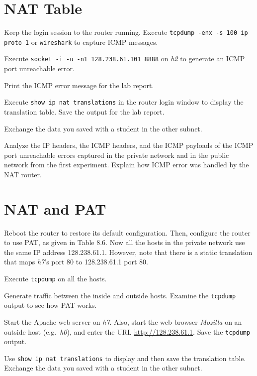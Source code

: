 \documentclass{../UTNetLab}
\begin{document}
\section{NAT Table}
    Keep the login session to the router running. Execute \lstinline{tcpdump -enx -s 100 ip proto 1} or \lstinline{wireshark} to capture ICMP messages. 

    Execute \lstinline{socket -i -u -n1 128.238.61.101 8888} on \textit{h2} to generate an ICMP port unreachable error. 

    Print the ICMP error message for the lab report. 

    Execute \lstinline{show ip nat translations} in the router login window to display the translation table.
    Save the output for the lab report.

    Exchange the data you saved with a student in the other subnet.
    
    \begin{report}
    \item Analyze the IP headers, the ICMP headers, and the ICMP payloads of the ICMP port unreachable errors captured in the private network and in the public network from the first experiment.
    Explain how ICMP error was handled by the NAT router.
    \end{report}

\section{NAT and PAT}
    Reboot the router to restore its default configuration.
    Then, configure the router to use PAT, as given in Table 8.6. Now all the hosts in the private network use the same IP address 128.238.61.1. However, note that there is a static translation that maps \textit{h7}’s port 80 to 128.238.61.1 port 80. 

    Execute \lstinline{tcpdump} on all the hosts. 

    Generate traffic between the inside and outside hosts.
    Examine the \lstinline{tcpdump} output to see how PAT works.

    Start the Apache web server on \textit{h7}. Also, start the web browser \textit{Mozilla} on an outside host (e.g.\ \textit{h0}), and enter the URL \url{http://128.238.61.1}. Save the \lstinline{tcpdump} output.

    Use \lstinline{show ip nat translations} to display and then save the translation table.
    Exchange the data you saved with a student in the other subnet.
\end{document}
